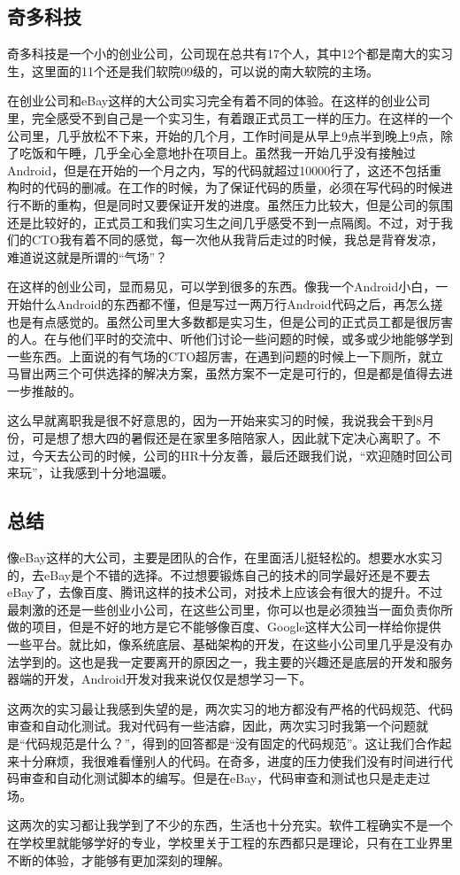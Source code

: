 \subsection{奇多科技}

奇多科技是一个小的创业公司，公司现在总共有17个人，其中12个都是南大的实习生，这里面的11个还是我们软院09级的，可以说的南大软院的主场。\par

在创业公司和eBay这样的大公司实习完全有着不同的体验。在这样的创业公司里，完全感受不到自己是一个实习生，有着跟正式员工一样的压力。在这样的一个公司里，几乎放松不下来，开始的几个月，工作时间是从早上9点半到晚上9点，除了吃饭和午睡，几乎全心全意地扑在项目上。虽然我一开始几乎没有接触过Android，但是在开始的一个月之内，写的代码就超过10000行了，这还不包括重构时的代码的删减。在工作的时候，为了保证代码的质量，必须在写代码的时候进行不断的重构，但是同时又要保证开发的进度。虽然压力比较大，但是公司的氛围还是比较好的，正式员工和我们实习生之间几乎感受不到一点隔阂。不过，对于我们的CTO我有着不同的感觉，每一次他从我背后走过的时候，我总是背脊发凉，难道说这就是所谓的“气场”？\par

在这样的创业公司，显而易见，可以学到很多的东西。像我一个Android小白，一开始什么Android的东西都不懂，但是写过一两万行Android代码之后，再怎么搓也是有点感觉的。虽然公司里大多数都是实习生，但是公司的正式员工都是很厉害的人。在与他们平时的交流中、听他们讨论一些问题的时候，或多或少地能够学到一些东西。上面说的有气场的CTO超厉害，在遇到问题的时候上一下厕所，就立马冒出两三个可供选择的解决方案，虽然方案不一定是可行的，但是都是值得去进一步推敲的。\par

这么早就离职我是很不好意思的，因为一开始来实习的时候，我说我会干到8月份，可是想了想大四的暑假还是在家里多陪陪家人，因此就下定决心离职了。不过，今天去公司的时候，公司的HR十分友善，最后还跟我们说，“欢迎随时回公司来玩”，让我感到十分地温暖。

\subsection{总结}

像eBay这样的大公司，主要是团队的合作，在里面活儿挺轻松的。想要水水实习的，去eBay是个不错的选择。不过想要锻炼自己的技术的同学最好还是不要去eBay了，去像百度、腾讯这样的技术公司，对技术上应该会有很大的提升。不过最刺激的还是一些创业小公司，在这些公司里，你可以也是必须独当一面负责你所做的项目，但是不好的地方是它不能够像百度、Google这样大公司一样给你提供一些平台。就比如，像系统底层、基础架构的开发，在这些小公司里几乎是没有办法学到的。这也是我一定要离开的原因之一，我主要的兴趣还是底层的开发和服务器端的开发，Android开发对我来说仅仅是想学习一下。\par

这两次的实习最让我感到失望的是，两次实习的地方都没有严格的代码规范、代码审查和自动化测试。我对代码有一些洁癖，因此，两次实习时我第一个问题就是“代码规范是什么？”，得到的回答都是“没有固定的代码规范”。这让我们合作起来十分麻烦，我很难看懂别人的代码。在奇多，进度的压力使我们没有时间进行代码审查和自动化测试脚本的编写。但是在eBay，代码审查和测试也只是走走过场。\par

这两次的实习都让我学到了不少的东西，生活也十分充实。软件工程确实不是一个在学校里就能够学好的专业，学校里关于工程的东西都只是理论，只有在工业界里不断的体验，才能够有更加深刻的理解。

